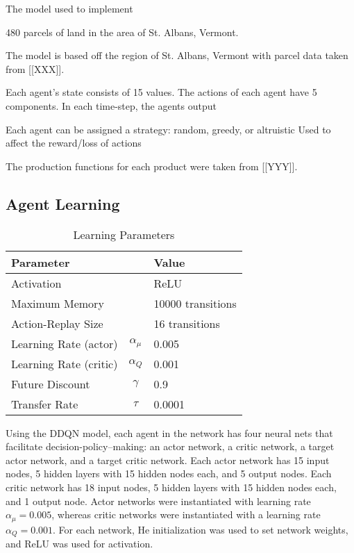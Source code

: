 \documentclass[12pt]{article}
\begin{document}
The model used to implement 

480 parcels of land in the area of St. Albans, Vermont.

The model is based off the region of St. Albans, Vermont with
parcel data taken from [[XXX]].

Each agent's state consists of 15 values.
The actions of each agent have 5 components.
In each time-step, the agents output

Each agent can be assigned a strategy: random, greedy, or altruistic
Used to affect the reward/loss of actions

The production functions for each product were taken from [[YYY]].

\subsection{Agent Learning}

\begin{table}
\caption{Learning Parameters}
\label{tab:lparams}
\centering
\begin{tabular}{l c l}
Parameter & & Value \\\hline
Activation & & ReLU \\
Maximum Memory & & 10000 transitions \\
Action-Replay Size & & 16 transitions \\
Learning Rate (actor) & $\alpha_\mu$ & 0.005 \\
Learning Rate (critic) & $\alpha_Q$ & 0.001 \\
Future Discount & $\gamma$ & 0.9 \\
Transfer Rate & $\tau$ & 0.0001 \\
\end{tabular}
\end{table}

Using the DDQN model, each agent in the network has four neural nets
that facilitate decision-policy--making:
an actor network, a critic network, a target actor network, and a target
critic network.
Each actor network has 15 input nodes, 5 hidden layers with 15 hidden nodes
each, and 5 output nodes.
Each critic network has 18 input nodes, 5 hidden layers with 15 hidden nodes
each, and 1 output node.
Actor networks were instantiated with learning rate $\alpha_\mu = 0.005$,
whereas critic networks were instantiated with a learning rate 
$\alpha_Q = 0.001$.
For each network, He initialization was used to set network weights,
and ReLU was used for activation.
\end{document}

